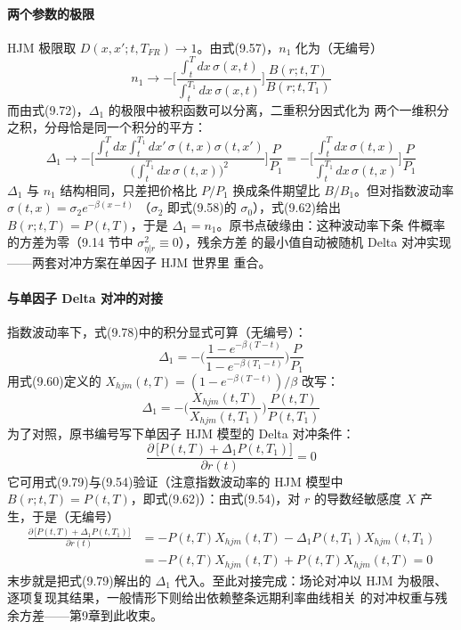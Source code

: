 \paragraph{两个参数的极限}
HJM 极限取 $D(x,x';t,T_{FR})\to1$。由式(9.57)，$n_1$ 化为（无编号）
\begin{equation*}
n_1\to-\biggl[\frac{\int_{t}^{T}dx\,\sigma(x,t)}
{\int_{t}^{T_1}dx\,\sigma(x,t)}\biggr]\frac{B(r;t,T)}{B(r;t,T_1)}
\end{equation*}
而由式(9.72)，$\Delta_1$ 的极限中被积函数可以分离，二重积分因式化为
两个一维积分之积，分母恰是同一个积分的平方：
\begin{equation*}
\Delta_1\to-\biggl[\frac{\int_{t}^{T}dx\int_{t}^{T_1}dx'\,
\sigma(t,x)\sigma(t,x')}{\bigl(\int_{t}^{T_1}dx\,\sigma(t,x)\bigr)^{2}}
\biggr]\frac{P}{P_1}
=-\biggl[\frac{\int_{t}^{T}dx\,\sigma(t,x)}
{\int_{t}^{T_1}dx\,\sigma(t,x)}\biggr]\frac{P}{P_1}\tag{9.78}
\end{equation*}
$\Delta_1$ 与 $n_1$ 结构相同，只差把价格比 $P/P_1$ 换成条件期望比
$B/B_1$。但对指数波动率 $\sigma(t,x)=\sigma_2e^{-\beta(x-t)}$
（$\sigma_2$ 即式(9.58)的 $\sigma_0$），式(9.62)给出
$B(r;t,T)=P(t,T)$，于是 $\Delta_1=n_1$。原书点破缘由：这种波动率下条
件概率的方差为零（9.14 节中 $\sigma_{\eta|r}^{2}\equiv0$），残余方差
的最小值自动被随机 Delta 对冲实现——两套对冲方案在单因子 HJM 世界里
重合。

\paragraph{与单因子 Delta 对冲的对接}
指数波动率下，式(9.78)中的积分显式可算（无编号）：
\begin{equation*}
\Delta_1=-\biggl(\frac{1-e^{-\beta(T-t)}}{1-e^{-\beta(T_1-t)}}\biggr)
\frac{P}{P_1}
\end{equation*}
用式(9.60)定义的 $X_{hjm}(t,T)=(1-e^{-\beta(T-t)})/\beta$ 改写：
\begin{equation*}
\Delta_1=-\biggl(\frac{X_{hjm}(t,T)}{X_{hjm}(t,T_1)}\biggr)
\frac{P(t,T)}{P(t,T_1)}\tag{9.79}
\end{equation*}
为了对照，原书编号写下单因子 HJM 模型的 Delta 对冲条件：
\begin{equation*}
\frac{\partial\,\bigl[P(t,T)+\Delta_1P(t,T_1)\bigr]}{\partial r(t)}=0
\tag{9.80}
\end{equation*}
它可用式(9.79)与(9.54)验证（注意指数波动率的 HJM 模型中
$B(r;t,T)=P(t,T)$，即式(9.62)）：由式(9.54)，对 $r$ 的导数经敏感度
$X$ 产生，于是（无编号）
\begin{align*}
\frac{\partial\,\bigl[P(t,T)+\Delta_1P(t,T_1)\bigr]}{\partial r(t)}
&=-P(t,T)X_{hjm}(t,T)-\Delta_1P(t,T_1)X_{hjm}(t,T_1)\\
&=-P(t,T)X_{hjm}(t,T)+P(t,T)X_{hjm}(t,T)=0
\end{align*}
末步就是把式(9.79)解出的 $\Delta_1$ 代入。至此对接完成：场论对冲以
HJM 为极限、逐项复现其结果，一般情形下则给出依赖整条远期利率曲线相关
的对冲权重与残余方差——第9章到此收束。

